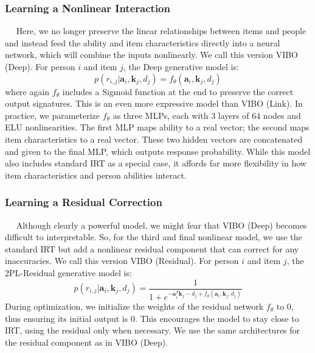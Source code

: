 \subsubsection{Learning a Nonlinear Interaction}$\quad$
Here, we no longer preserve the linear relationships between items and people and instead feed the ability and item characteristics directly into a neural network, which will combine the inputs nonlinearly.
We call this version VIBO (Deep).
For person $i$ and item $j$, the Deep generative model is:
\begin{equation}
    p(r_{i,j}|\textbf{a}_i, \textbf{k}_j, d_j) = f_\theta(\textbf{a}_i,\textbf{k}_j, d_j)
\end{equation}
where again $f_\theta$ includes a Sigmoid function at the end to preserve the correct output signatures.
This is an even more expressive model than VIBO (Link).
In practice, we parameterize $f_\theta$ as three MLPs, each with 3 layers of 64 nodes and ELU nonlinearities. 
The first MLP maps ability to a real vector; the second maps item characteristics to a real vector.
These two hidden vectors are concatenated and given to the final MLP, which outputs response probability.
While this model also includes standard IRT as a special case, it affords far more flexibility in how item characteristics and person abilities interact.

\subsubsection{Learning a Residual Correction}$\quad$
Although clearly a powerful model, we might fear that VIBO (Deep) becomes difficult to interpretable.
So, for the third and final nonlinear model, we use the standard IRT but add a nonlinear residual component that can correct for any inaccuracies.
We call this version VIBO (Residual).
For person $i$ and item $j$, the 2PL-Residual generative model is:
\begin{equation}
    p(r_{i,j}|\textbf{a}_i, \textbf{k}_j, d_j) = \frac{1}{1 + e^{-\textbf{a}^T_i\textbf{k}_j - d_j + f_\theta(\textbf{a}_i,\textbf{k}_j,d_j)}}
\end{equation}
During optimization, we initialize the weights of the residual network $f_\theta$ to 0, thus ensuring its initial output is 0.
This encourages the model to stay close to IRT, using the residual only when necessary.
We use the same architectures for the residual component as in VIBO (Deep).

